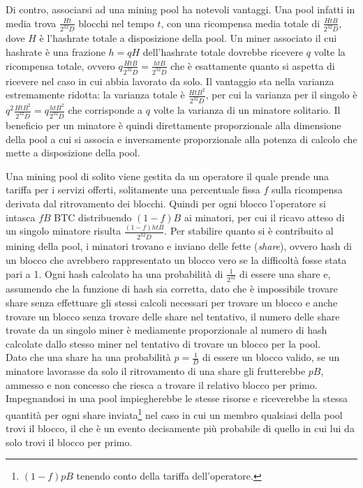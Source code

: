 Di contro, associarsi ad una mining pool ha notevoli vantaggi. Una pool infatti in media trova $\frac{Ht}{2^{32}D}$ blocchi nel tempo $t$, con una ricompensa media totale di $\frac{HtB}{2^{32}D}$, dove $H$ è l'hashrate totale a disposizione della pool. Un miner associato il cui hashrate è una frazione $h = qH$ dell'hashrate totale dovrebbe ricevere $q$ volte la ricompensa totale, ovvero $q\frac{HtB}{2^{32}D} = \frac{htB}{2^{32}D}$ che è esattamente quanto si aspetta di ricevere nel caso in cui abbia lavorato da solo. Il vantaggio sta nella varianza estremamente ridotta: la varianza totale è $\frac{HtB^2}{2^{32}D}$, per cui la varianza per il singolo è $q^2 \frac{HtB^2}{2^{32}D} = q\frac{htB^2}{2^{32}D}$ che corrisponde a $q$ volte la varianza di un minatore solitario. Il beneficio per un minatore è quindi direttamente proporzionale alla dimensione della pool a cui si associa e inversamente proporzionale alla potenza di calcolo che mette a disposizione della pool.

Una mining pool di solito viene gestita da un operatore il quale prende una tariffa per i servizi offerti, solitamente una percentuale fissa $f$ sulla ricompensa derivata dal ritrovamento dei blocchi. Quindi per ogni blocco l'operatore si intasca $fB$ BTC distribuendo $(1-f)B$ ai minatori, per cui il ricavo atteso di un singolo minatore risulta $\frac{(1-f)htB}{2^{32}D}$.
Per stabilire quanto si è contribuito al mining della pool, i minatori trovano e inviano delle fette (\emph{share}), ovvero hash di un blocco che avrebbero rappresentato un blocco vero se la difficoltà fosse stata pari a 1. Ogni hash calcolato ha una probabilità di $\frac{1}{2^{32}}$ di essere una share e, assumendo che la funzione di hash sia corretta, dato che è impossibile trovare share senza effettuare gli stessi calcoli necessari per trovare un blocco e anche trovare un blocco senza trovare delle share nel tentativo, il numero delle share trovate da un singolo miner è mediamente proporzionale al numero di hash calcolate dallo stesso miner nel tentativo di trovare un blocco per la pool.\\
Dato che una share ha una probabilità $p = \frac{1}{D}$ di essere un blocco valido, se un minatore lavorasse da solo il ritrovamento di una share gli frutterebbe $pB$, ammesso e non concesso che riesca a trovare il relativo blocco per primo. Impegnandosi in una pool impiegherebbe le stesse risorse e riceverebbe la stessa quantità per ogni share inviata\footnote{$(1-f)pB$ tenendo conto della tariffa dell'operatore.} nel caso in cui un membro qualsiasi della pool trovi il blocco, il che è un evento decisamente più probabile di quello in cui lui da solo trovi il blocco per primo.\\

